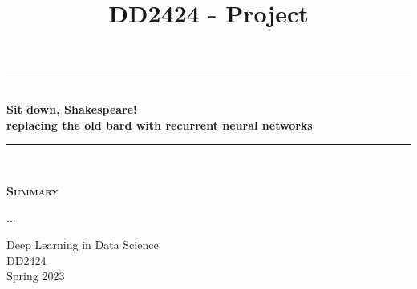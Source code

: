 \documentclass{article}
\title{DD2424 - Project}
\begin{document}

	\begin{titlepage}
		\begin{center} 
			
			\rule{\linewidth}{0.5mm}\\[0.5 cm]
			{ \huge \bfseries Sit down, Shakespeare!}\\[0.3 cm]
			{ \bfseries replacing the old bard with recurrent neural networks}\\[0.3cm]
			\rule{\linewidth}{0.5mm}\\[1 cm]
					
			\small\vfill
			\begin{center}
			\centering
			{\large \bfseries \textsc{Summary}}\\
			\vspace{1cm}
			\begin{minipage}{10cm}
				
				...
			\end{minipage}
			\end{center}
			\large\vfill
						

		\end{center}	
		
		\begin{minipage}{0.4\textwidth}
			\begin{flushleft} \small
				Deep Learning in Data Science\\
				DD2424\\
				Spring 2023
			\end{flushleft}
		\end{minipage}	

	\end{titlepage}

\newpage
\end{document}

